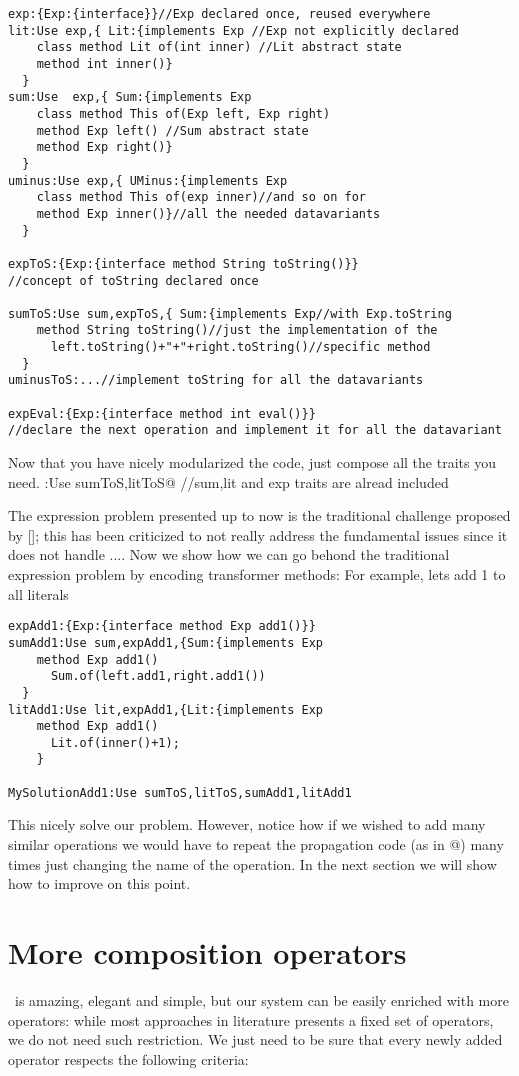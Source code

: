 \begin{lstlisting}
exp:{Exp:{interface}}//Exp declared once, reused everywhere
lit:Use exp,{ Lit:{implements Exp //Exp not explicitly declared
    class method Lit of(int inner) //Lit abstract state
    method int inner()}
  }
sum:Use  exp,{ Sum:{implements Exp 
    class method This of(Exp left, Exp right)
    method Exp left() //Sum abstract state
    method Exp right()}
  }  
uminus:Use exp,{ UMinus:{implements Exp 
    class method This of(exp inner)//and so on for
    method Exp inner()}//all the needed datavariants
  }   
  
expToS:{Exp:{interface method String toString()}}
//concept of toString declared once

sumToS:Use sum,expToS,{ Sum:{implements Exp//with Exp.toString
    method String toString()//just the implementation of the
      left.toString()+"+"+right.toString()//specific method
  }
uminusToS:...//implement toString for all the datavariants

expEval:{Exp:{interface method int eval()}}
//declare the next operation and implement it for all the datavariant
\end{lstlisting}

Now that you have nicely modularized the code, just compose all the traits you need.
\Q@MySolution:Use sumToS,litToS@ //sum,lit and exp traits are alread included

The expression problem presented up to now is the traditional challenge proposed by [];
this has been criticized to not really address the fundamental issues since it does not handle ....
Now we show how we can go behond the traditional expression problem by encoding transformer methods:
For example, lets add 1 to all literals
\begin{lstlisting}
expAdd1:{Exp:{interface method Exp add1()}}
sumAdd1:Use sum,expAdd1,{Sum:{implements Exp
    method Exp add1()
      Sum.of(left.add1,right.add1())
  }
litAdd1:Use lit,expAdd1,{Lit:{implements Exp
    method Exp add1()
      Lit.of(inner()+1);
    }

MySolutionAdd1:Use sumToS,litToS,sumAdd1,litAdd1
\end{lstlisting}

This nicely solve our problem. 
However, notice how if we wished to add many similar operations we would 
have to repeat the propagation code (as in @) many times
just changing the name of the operation.
In the next section we will show how to improve on this point.


\section{More composition operators}
\use\ is amazing, elegant and simple, but our system can be easily enriched with more 
operators: while most approaches in literature presents a fixed set of operators, we do not need such restriction.
We just need to be sure that every newly added operator respects the following criteria:

